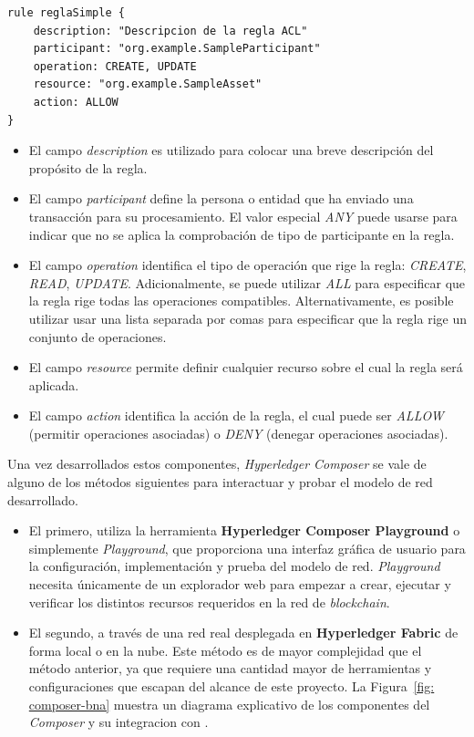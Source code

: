\begin{lstlisting}
rule reglaSimple {
    description: "Descripcion de la regla ACL"
    participant: "org.example.SampleParticipant"
    operation: CREATE, UPDATE
    resource: "org.example.SampleAsset"
    action: ALLOW
}
\end{lstlisting}
\begin{itemize}
    \item El campo \textit{description} es utilizado para colocar una breve descripción del propósito de la regla.
    \item El campo \textit{participant} define la persona o entidad que ha enviado una transacción para su procesamiento. El valor especial \textit{ANY} puede usarse para indicar que no se aplica la comprobación de tipo de participante en la regla.
    \item  El campo \textit{operation} identifica el tipo de operación que rige la regla: \textit{CREATE}, \textit{READ}, \textit{UPDATE}. Adicionalmente, se puede utilizar \textit{ALL} para especificar que la regla rige todas las operaciones compatibles. Alternativamente, es posible utilizar usar una lista separada por comas para especificar que la regla rige un conjunto de operaciones.
    \item  El campo \textit{resource} permite definir cualquier recurso sobre el cual la regla será aplicada.
    \item  El campo \textit{action} identifica la acción de la regla, el cual puede ser \textit{ALLOW} (permitir operaciones asociadas) o \textit{DENY} (denegar operaciones asociadas).
\end{itemize}
 
Una vez desarrollados estos componentes, \textit{Hyperledger Composer} se vale de alguno  de los métodos siguientes para interactuar y probar el modelo de red desarrollado.
\begin{itemize}
    \item El primero, utiliza la herramienta \textbf{Hyperledger Composer Playground} o simplemente \textit{Playground}, que proporciona una interfaz gráfica de usuario para la configuración, implementación y prueba del modelo de red. \textit{Playground} necesita únicamente de un explorador web para empezar a crear, ejecutar y verificar los distintos recursos requeridos en la red de {\it blockchain}.
    
    \item El segundo, a través de una red real desplegada en  \textbf{Hyperledger Fabric} de forma local o en la nube. Este método es de mayor complejidad que el método anterior, ya que requiere una cantidad mayor de herramientas y configuraciones que escapan del alcance de este proyecto. La Figura~\ref{fig: composer-bna} muestra un diagrama explicativo de los componentes del \textit{Composer} y su integracion con .
\end{itemize}

